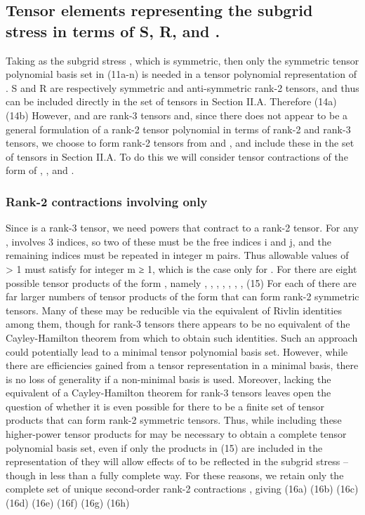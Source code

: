 \subsection{Tensor elements   representing the subgrid stress   in terms of S, R,   and  .}

Taking   as the subgrid stress  , which is symmetric, then only the symmetric tensor polynomial basis set in (11a-n) is needed in a tensor polynomial representation of  .  S and R are respectively symmetric and anti-symmetric rank-2 tensors, and thus can be included directly in the set of tensors   in Section II.A.  Therefore
	 	(14a)
	  	(14b)
However,   and   are rank-3 tensors and, since there does not appear to be a general formulation of a rank-2 tensor polynomial in terms of rank-2 and rank-3 tensors, we choose to form rank-2 tensors from   and  , and include these in the set of tensors   in Section II.A.  To do this we will consider tensor contractions of the form of  ,  , and  .


\subsubsection{Rank-2 contractions involving only  }

Since   is a rank-3 tensor, we need powers   that contract   to a rank-2 tensor. For any  ,   involves 3  indices, so two of these must be the free indices i and j, and the remaining indices must be repeated in integer m pairs. Thus allowable values of   > 1 must satisfy   for integer m ≥ 1, which is the case only for   .  For   there are eight possible tensor products of the form  , namely
 ,   ,   ,   ,   ,   ,  ,     (15) 
For each of   there are far larger numbers of tensor products of the form   that can form rank-2 symmetric tensors.  Many of these may be reducible via the equivalent of Rivlin identities among them, though for rank-3 tensors there appears to be no equivalent of the Cayley-Hamilton theorem from which to obtain such identities.  Such an approach could potentially lead to a minimal tensor polynomial basis set.  However, while there are efficiencies gained from a tensor representation in a minimal basis, there is no loss of generality if a non-minimal basis is used. Moreover, lacking the equivalent of a Cayley-Hamilton theorem for rank-3 tensors leaves open the question of whether it is even possible for there to be a finite set of tensor products   that can form rank-2 symmetric tensors. 
Thus, while including these higher-power tensor products   for   may be necessary to obtain a complete tensor polynomial basis set, even if only the   products in (15) are included in the representation of   they will allow effects of   to be reflected in the subgrid stress – though in less than a fully complete way.  For these reasons, we retain only the complete set of unique second-order rank-2 contractions  , giving
	 	(16a)
	 	(16b) 
	 	(16c) 
	 	(16d) 
	 	(16e) 
	 	(16f) 
	 	(16g)
	 	(16h)

